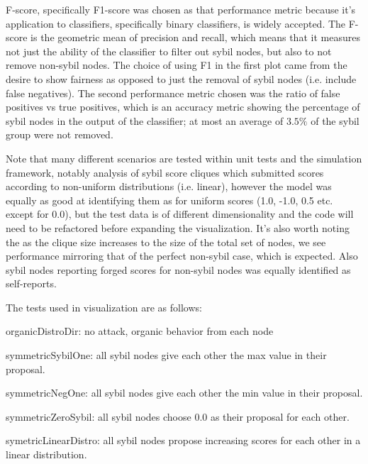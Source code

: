\documentclass{article}
\begin{document}
F-score, specifically F1-score was chosen as that performance metric because it's application to classifiers, specifically binary classifiers, is widely accepted. The F-score is the geometric mean of precision and recall, which means that it measures not just the ability of the classifier to filter out sybil nodes, but also to not remove non-sybil nodes. The choice of using F1 in the first plot came from the desire to show fairness as opposed to just the removal of sybil nodes (i.e. include false negatives). The second performance metric chosen was the ratio of false positives vs true positives, which is an accuracy metric showing the percentage of sybil nodes in the output of the classifier; at most an average of $3.5\%$ of the sybil group were not removed. 

Note that many different scenarios are tested within unit tests and the simulation framework, notably analysis of sybil score cliques which submitted scores according to non-uniform distributions (i.e. linear), however the model was equally as good at identifying them as for uniform scores (1.0, -1.0, 0.5 etc. except for 0.0), but the test data is of different dimensionality and the code will need to be refactored before expanding the visualization. It's also worth noting the as the clique size increases to the size of the total set of nodes, we see performance mirroring that of the perfect non-sybil case, which is expected. Also sybil nodes reporting forged scores for non-sybil nodes was equally identified as self-reports.

The tests used in visualization are as follows:

organicDistroDir: no attack, organic behavior from each node

symmetricSybilOne: all sybil nodes give each other the max value in their proposal.

symmetricNegOne: all sybil nodes give each other the min value in their proposal.

symmetricZeroSybil: all sybil nodes choose 0.0 as their proposal for each other.

symetricLinearDistro: all sybil nodes propose increasing scores for each other in a linear distribution.
\end{document}
